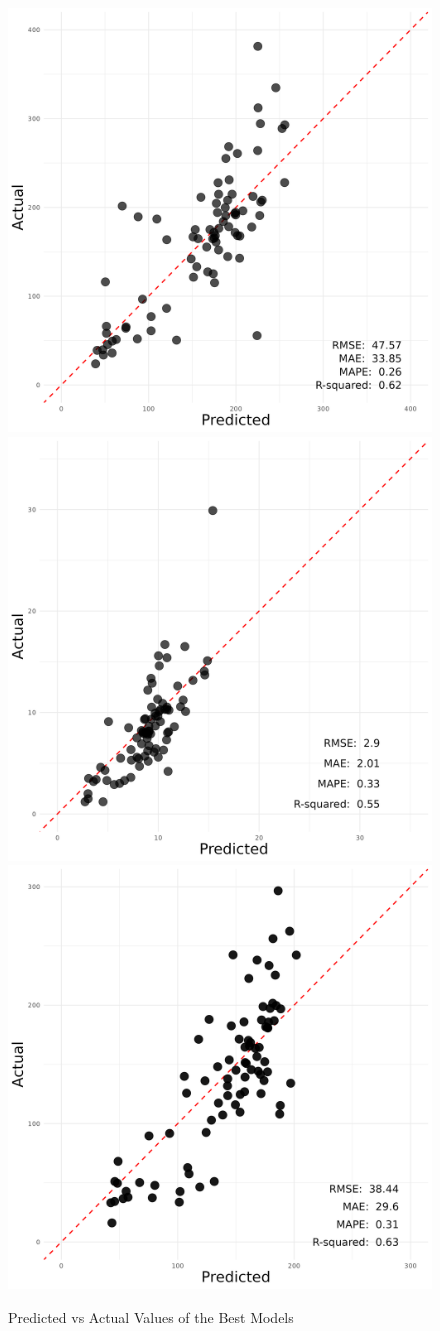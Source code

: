 \documentclass[11pt,a4paper,]{article}
\begin{document}
\begin{figure}

{\centering \includegraphics[width=0.33\linewidth,height=0.2\textheight]{./Final_report_files/figure-latex/results_ree_test_best} \includegraphics[width=0.33\linewidth,height=0.2\textheight]{./Final_report_files/figure-latex/results_hree_test_best} \includegraphics[width=0.33\linewidth,height=0.2\textheight]{./Final_report_files/figure-latex/results_lree_test_best} 

}

\caption{Predicted vs Actual Values of the Best Models}\label{fig:bestplot}
\end{figure}
\end{document}
